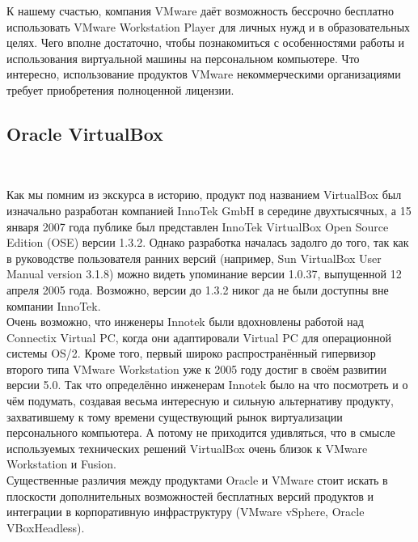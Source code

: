 \documentclass[14pt, a4paper]{article}
\begin{document}
К нашему счастью, компания VMware даёт возможность бессрочно бесплатно использовать VMware
Workstation Player для личных нужд и в образовательных целях. Чего вполне достаточно, чтобы
познакомиться с особенностями работы и использования виртуальной машины на персональном
компьютере. Что интересно, использование продуктов VMware некоммерческими организациями
требует приобретения полноценной лицензии.

\subsection*{Oracle VirtualBox} 

\begin{figure}[h]
    \centering
    \\
    \label{framework} 
\end{figure}

\noindent Как мы помним из экскурса в историю, продукт под названием VirtualBox был изначально разработан
компанией InnoTek GmbH в середине двухтысячных, а 15 января 2007 года публике был представлен
InnoTek VirtualBox Open Source Edition (OSE) версии 1.3.2. Однако разработка началась задолго до
того, так как в руководстве пользователя ранних версий (например, Sun VirtualBox User Manual version
3.1.8) можно видеть упоминание версии 1.0.37, выпущенной 12 апреля 2005 года. Возможно, версии
до 1.3.2 никог да не были доступны вне компании InnoTek.\\

Очень возможно, что инженеры Innotek были вдохновлены работой над Connectix Virtual PC, когда они
адаптировали Virtual PC для операционной системы OS/2. Кроме того, первый широко
распространённый гипервизор второго типа VMware Workstation уже к 2005 году достиг в своём
развитии версии 5.0. Так что определённо инженерам Innotek было на что посмотреть и о чём
подумать, создавая весьма интересную и сильную альтернативу продукту, захватившему к тому
времени существующий рынок виртуализации персонального компьютера. А потому не приходится
удивляться, что в смысле используемых технических решений VirtualBox очень близок к VMware
Workstation и Fusion.\\

Существенные различия между продуктами Oracle и VMware стоит искать в плоскости
дополнительных возможностей бесплатных версий продуктов и интеграции в корпоративную
инфраструктуру (VMware vSphere, Oracle VBoxHeadless).\\
\end{document}
